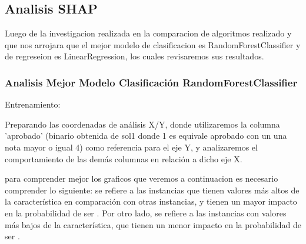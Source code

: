 \subsection{Analisis SHAP}

Luego de la investigacion realizada en la comparacion de algoritmos realizado y que nos arrojara que el mejor modelo de clasificacion es RandomForestClassifier y de regreseion es LinearRegression, los cuales revisaremos sus resultados.

\subsubsection{Analisis Mejor Modelo Clasificación RandomForestClassifier}
Entrenamiento:

Preparando las coordenadas de análisis X/Y, donde utilizaremos la columna 'aprobado' (binario obtenida de sol1 donde 1 es equivale aprobado con un una nota mayor o igual 4) como referencia para el eje Y, y analizaremos el comportamiento de las demás columnas en relación a dicho eje X.

para comprender mejor los graficos que veremos a continuacion es necesario comprender lo siguiente:
 se refiere a las instancias que tienen valores más altos de la característica en comparación con otras instancias, y tienen un mayor impacto en la probabilidad de ser . Por otro lado,  se refiere a las instancias con valores más bajos de la característica, que tienen un menor impacto en la probabilidad de ser .

